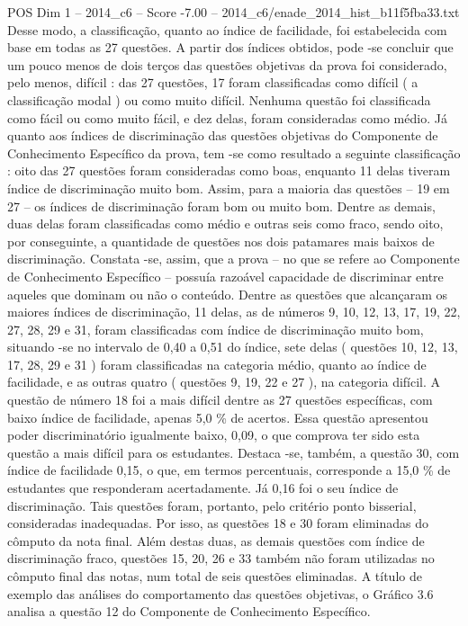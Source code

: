 \begin{textsample}{POS Dim 1 – 2014\_c6 – Score -7.00 – 2014\_c6/enade\_2014\_hist\_b11f5fba33.txt}
Desse modo, a classificação, quanto ao índice de facilidade, foi estabelecida com base em todas as 27 questões.
A partir dos índices obtidos, pode -se concluir que um pouco menos de dois terços das questões objetivas da prova foi considerado, pelo menos, difícil : das 27 questões, 17 foram classificadas como difícil ( a classificação modal ) ou como muito difícil.
Nenhuma questão foi classificada como fácil ou como muito fácil, e dez delas, foram consideradas como médio.
Já quanto aos índices de discriminação das questões objetivas do Componente de Conhecimento Específico da prova, tem -se como resultado a seguinte classificação : oito das 27 questões foram consideradas como boas, enquanto 11 delas tiveram índice de discriminação muito bom.
Assim, para a maioria das questões – 19 em 27 – os índices de discriminação foram bom ou muito bom.
Dentre as demais, duas delas foram classificadas como médio e outras seis como fraco, sendo oito, por conseguinte, a quantidade de questões nos dois patamares mais baixos de discriminação.
Constata -se, assim, que a prova – no que se refere ao Componente de Conhecimento Específico – possuía razoável capacidade de discriminar entre aqueles que dominam ou não o conteúdo.
Dentre as questões que alcançaram os maiores índices de discriminação, 11 delas, as de números 9, 10, 12, 13, 17, 19, 22, 27, 28, 29 e 31, foram classificadas com índice de discriminação muito bom, situando -se no intervalo de 0,40 a 0,51 do índice, sete delas ( questões 10, 12, 13, 17, 28, 29 e 31 ) foram classificadas na categoria médio, quanto ao índice de facilidade, e as outras quatro ( questões 9, 19, 22 e 27 ), na categoria difícil.
A questão de número 18 foi a mais difícil dentre as 27 questões específicas, com baixo índice de facilidade, apenas 5,0 \% de acertos.
Essa questão apresentou poder discriminatório igualmente baixo, 0,09, o que comprova ter sido esta questão a mais difícil para os estudantes.
Destaca -se, também, a questão 30, com índice de facilidade 0,15, o que, em termos percentuais, corresponde a 15,0 \% de estudantes que responderam acertadamente.
Já 0,16 foi o seu índice de discriminação.
Tais questões foram, portanto, pelo critério ponto bisserial, consideradas inadequadas.
Por isso, as questões 18 e 30 foram eliminadas do cômputo da nota final.
Além destas duas, as demais questões com índice de discriminação fraco, questões 15, 20, 26 e 33 também não foram utilizadas no cômputo final das notas, num total de seis questões eliminadas.
A título de exemplo das análises do comportamento das questões objetivas, o Gráfico 3.6 analisa a questão 12 do Componente de Conhecimento Específico.

\end{textsample}
